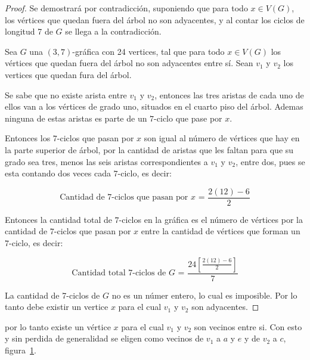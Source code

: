 \documentclass[12pt]{book}
\theoremstyle{definition}
\begin{document}
\begin{proof}
Se demostrará por contradicción, suponiendo que para todo $x\in V(G)$,
los vértices que quedan fuera del árbol no son adyacentes, y al contar
los ciclos de longitud 7 de $G$ se llega a la contradicción.  


Sea $G$ una $(3,7)$-gráfica con 24 vertices, tal que para todo $x\in V(G)$ los
vértices que quedan fuera del árbol no son adyacentes entre sí. Sean
$v_1$ y $v_2$ los vertices que quedan fura del árbol.

Se sabe que no existe arista entre $v_1$
y $v_2$, entonces las tres aristas de cada uno de ellos van a los
vértices de grado uno, situados en el cuarto piso del árbol. Ademas
ninguna de estas aristas es parte de un
$7$-ciclo que pase por $x$.

Entonces los $7$-ciclos que pasan por $x$
son igual al número de vértices que hay en la parte superior de árbol,
por la cantidad de aristas que les faltan para que su grado sea tres, menos
las seis aristas correspondientes a $v_1$ y $v_2$, entre dos, pues se
esta contando dos veces cada $7$-ciclo, es decir:

\begin{equation*}
  \text{Cantidad de $7$-ciclos que pasan por $x$ = } \frac{2(12)-6}{2}
\end{equation*}


Entonces la cantidad total de $7$-ciclos en la gráfica es el número de
vértices por la cantidad de $7$-ciclos que pasan por $x$ entre la
cantidad de vértices que forman un $7$-ciclo, es decir:

\begin{equation*}
\text{Cantidad total 7-ciclos de $G$ = }\frac{24[\frac{2(12)-6}{2}]}{7} 
\end{equation*}

La cantidad de 7-ciclos de $G$ no es un númer entero, lo cual es
imposible. Por lo tanto debe existir un vertice $x$ para el cual $v_1$
y $v_2$ son adyacentes.
\end{proof}


por lo tanto
existe un vértice $x$ para el cual $v_1$ y $v_2$ son vecinos entre
si. Con esto y sin perdida de generalidad se eligen como vecinos de
$v_1$ a $a$ y $e$ y de $v_2$ a $c$, figura~\ref{grafica(3,7)mas2}.



\begin{figure}
  \centering
  \caption{} \label{grafica(3,7)mas2}
\end{figure}
\end{document}
